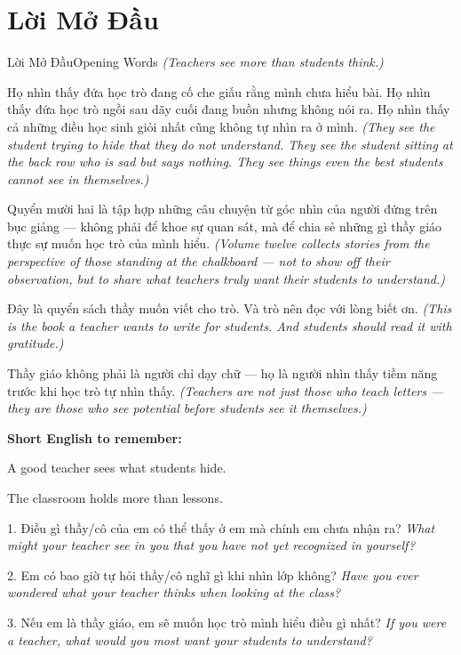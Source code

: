 \chapter*{Lời Mở Đầu}

\begin{truyen}{Lời Mở Đầu}{Opening Words}
\textit{(Teachers see more than students think.)}

Họ nhìn thấy đứa học trò đang cố che giấu rằng mình chưa hiểu bài. Họ nhìn thấy đứa học trò ngồi sau dãy cuối đang buồn nhưng không nói ra. Họ nhìn thấy cả những điều học sinh giỏi nhất cũng không tự nhìn ra ở mình.
\textit{(They see the student trying to hide that they do not understand. They see the student sitting at the back row who is sad but says nothing. They see things even the best students cannot see in themselves.)}

Quyển mười hai là tập hợp những câu chuyện từ góc nhìn của người đứng trên bục giảng — không phải để khoe sự quan sát, mà để chia sẻ những gì thầy giáo thực sự muốn học trò của mình hiểu.
\textit{(Volume twelve collects stories from the perspective of those standing at the chalkboard --- not to show off their observation, but to share what teachers truly want their students to understand.)}

Đây là quyển sách thầy muốn viết cho trò. Và trò nên đọc với lòng biết ơn.
\textit{(This is the book a teacher wants to write for students. And students should read it with gratitude.)}
\end{truyen}

\begin{baihoc}
Thầy giáo không phải là người chỉ dạy chữ --- họ là người nhìn thấy tiềm năng trước khi học trò tự nhìn thấy.
\textit{(Teachers are not just those who teach letters --- they are those who see potential before students see it themselves.)}
\end{baihoc}

\begin{ghinhoanh}
\textbf{Short English to remember:}

A good teacher sees what students hide.

The classroom holds more than lessons.
\end{ghinhoanh}

\begin{tuhocnhanh}
1. Điều gì thầy/cô của em có thể thấy ở em mà chính em chưa nhận ra? \textit{What might your teacher see in you that you have not yet recognized in yourself?}

2. Em có bao giờ tự hỏi thầy/cô nghĩ gì khi nhìn lớp không? \textit{Have you ever wondered what your teacher thinks when looking at the class?}

3. Nếu em là thầy giáo, em sẽ muốn học trò mình hiểu điều gì nhất? \textit{If you were a teacher, what would you most want your students to understand?}
\end{tuhocnhanh}

\ngancach
